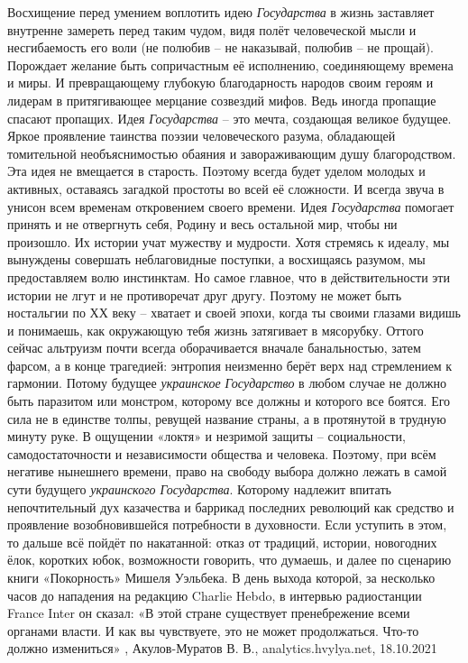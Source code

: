 Восхищение перед умением воплотить идею \emph{Государства} в жизнь заставляет
внутренне замереть перед таким чудом, видя полёт человеческой мысли и
несгибаемость его воли (не полюбив – не наказывай, полюбив – не прощай).
Порождает желание быть сопричастным её исполнению, соединяющему времена и миры.
И превращающему глубокую благодарность народов своим героям и лидерам в
притягивающее мерцание созвездий мифов. Ведь иногда пропащие спасают пропащих.
Идея \emph{Государства} – это мечта, создающая великое будущее. Яркое проявление
таинства поэзии человеческого разума, обладающей томительной необъяснимостью
обаяния и завораживающим душу благородством. Эта идея не вмещается в старость.
Поэтому всегда будет уделом молодых и активных, оставаясь загадкой простоты во
всей её сложности. И всегда звуча в унисон всем временам откровением своего
времени.  Идея \emph{Государства} помогает принять и не отвергнуть себя, Родину и весь
остальной мир, чтобы ни произошло. Их истории учат мужеству и мудрости. Хотя
стремясь к идеалу, мы вынуждены совершать неблаговидные поступки, а восхищаясь
разумом, мы предоставляем волю инстинктам. Но самое главное, что в
действительности эти истории не лгут и не противоречат друг другу. Поэтому не
может быть ностальгии по ХХ веку – хватает и своей эпохи, когда ты своими
глазами видишь и понимаешь, как окружающую тебя жизнь затягивает в мясорубку.
Оттого сейчас альтруизм почти всегда оборачивается вначале банальностью, затем
фарсом, а в конце трагедией: энтропия неизменно берёт верх над стремлением к
гармонии.  Потому будущее \emph{украинское Государство} в любом случае не должно быть
паразитом или монстром, которому все должны и которого все боятся. Его сила не
в единстве толпы, ревущей название страны, а в протянутой в трудную минуту
руке. В ощущении «локтя» и незримой защиты – социальности, самодостаточности и
независимости общества и человека.  Поэтому, при всём негативе нынешнего
времени, право на свободу выбора должно лежать в самой сути будущего
\emph{украинского Государства}. Которому надлежит впитать непочтительный дух
казачества и баррикад последних революций как средство и проявление
возобновившейся потребности в духовности. Если уступить в этом, то дальше всё
пойдёт по накатанной: отказ от традиций, истории, новогодних ёлок, коротких
юбок, возможности говорить, что думаешь, и далее по сценарию книги «Покорность»
Мишеля Уэльбека. В день выхода которой, за несколько часов до нападения на
редакцию Charlie Hebdo, в интервью радиостанции France Inter он сказал: «В этой
стране существует пренебрежение всеми органами власти. И как вы чувствуете, это
не может продолжаться. Что-то должно измениться»
, 
Акулов-Муратов В. В., analytics.hvylya.net, 18.10.2021

